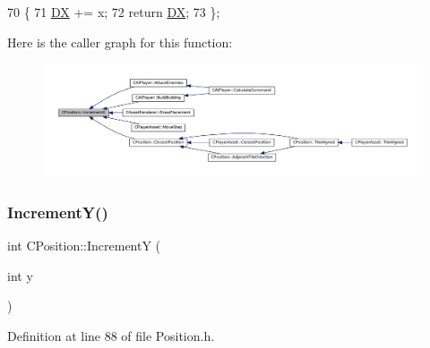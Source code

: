 \begin{DoxyCode}
70                              \{
71             \hyperlink{classCPosition_a28445f9b872169715919074d82044eda}{DX} += x; 
72             \textcolor{keywordflow}{return} \hyperlink{classCPosition_a28445f9b872169715919074d82044eda}{DX};
73         \};
\end{DoxyCode}
Here is the caller graph for this function\+:\nopagebreak
\begin{figure}[H]
\begin{center}
\leavevmode
\includegraphics[width=350pt]{classCPosition_aa5955d67d5ab7ca74d80cb7303b6eaa9_icgraph}
\end{center}
\end{figure}
\hypertarget{classCPosition_a3f2a26798bb27b1252ff1be303b3adfc}{}\label{classCPosition_a3f2a26798bb27b1252ff1be303b3adfc} 
\subsubsection{\texorpdfstring{Increment\+Y()}{IncrementY()}}
{\footnotesize\ttfamily int C\+Position\+::\+IncrementY (\begin{DoxyParamCaption}\item[{int}]{y }\end{DoxyParamCaption})\hspace{0.3cm}{\ttfamily [inline]}}



Definition at line 88 of file Position.\+h.


